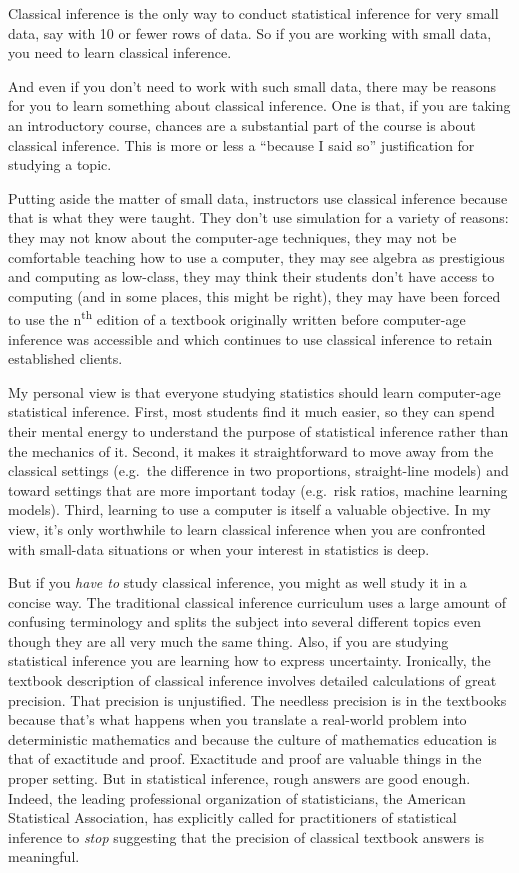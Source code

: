\documentclass[]{tufte-book}
\begin{document}
Classical inference is the only way to conduct statistical inference for very small data, say with 10 or fewer rows of data. So if you are working with small data, you need to learn classical inference.

And even if you don't need to work with such small data, there may be reasons for you to learn something about classical inference. One is that, if you are taking an introductory course, chances are a substantial part of the course is about classical inference. This is more or less a ``because I said so'' justification for studying a topic.

Putting aside the matter of small data, instructors use classical inference because that is what they were taught. They don't use simulation for a variety of reasons: they may not know about the computer-age techniques, they may not be comfortable teaching how to use a computer, they may see algebra as prestigious and computing as low-class, they may think their students don't have access to computing (and in some places, this might be right), they may have been forced to use the n\textsuperscript{th} edition of a textbook originally written before computer-age inference was accessible and which continues to use classical inference to retain established clients.

My personal view is that everyone studying statistics should learn computer-age statistical inference. First, most students find it much easier, so they can spend their mental energy to understand the purpose of statistical inference rather than the mechanics of it. Second, it makes it straightforward to move away from the classical settings (e.g.~the difference in two proportions, straight-line models) and toward settings that are more important today (e.g.~risk ratios, machine learning models). Third, learning to use a computer is itself a valuable objective. In my view, it's only worthwhile to learn classical inference when you are confronted with small-data situations or when your interest in statistics is deep.

But if you \emph{have to} study classical inference, you might as well study it in a concise way. The traditional classical inference curriculum uses a large amount of confusing terminology and splits the subject into several different topics even though they are all very much the same thing. Also, if you are studying statistical inference you are learning how to express uncertainty. Ironically, the textbook description of classical inference involves detailed calculations of great precision. That precision is unjustified. The needless precision is in the textbooks because that's what happens when you translate a real-world problem into deterministic mathematics and because the culture of mathematics education is that of exactitude and proof. Exactitude and proof are valuable things in the proper setting. But in statistical inference, rough answers are good enough. Indeed, the leading professional organization of statisticians, the American Statistical Association, has explicitly called for practitioners of statistical inference to \emph{stop} suggesting that the precision of classical textbook answers is meaningful.
\end{document}
